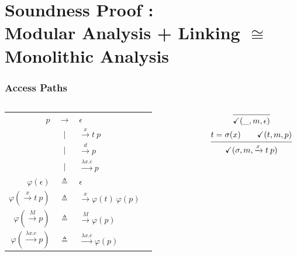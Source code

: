 \documentclass{beamer}
\theoremstyle{definition}
\newcommand*{\modid}{d}
\newcommand*{\ctx}{\sigma}
\newcommand*{\mem}{m}
\newcommand*{\valid}{\checkmark}
\newcommand*{\equivalent}{\cong}
\begin{document}
\section{Soundness Proof :\\Modular Analysis + Linking \texorpdfstring{$\equivalent$}{a} Monolithic Analysis}
\begin{frame}[c]
  \frametitle{Access Paths}
  \scriptsize
  \begin{columns}
    \begin{column}{0.3\linewidth}
      \begin{tabular}{|rcl|r}
        \hline
        $p$                                   & $\rightarrow$ & $\epsilon$                              \\
                                              & $|$           & $\xrightarrow{x}t\:p$                   \\
                                              & $|$           & $\xrightarrow{\modid}p$                 \\
                                              & $|$           & $\xrightarrow{\lambda x.e}p$            \\
        $\varphi(\epsilon)$                   & $\triangleq$  & $\epsilon$                              \\
        $\varphi(\xrightarrow{x}t\:p)$        & $\triangleq$  & $\xrightarrow{x}\varphi(t)\:\varphi(p)$ \\
        $\varphi(\xrightarrow{M}p)$           & $\triangleq$  & $\xrightarrow{M}\varphi(p)$             \\
        $\varphi(\xrightarrow{\lambda x.e}p)$ & $\triangleq$  & $\xrightarrow{\lambda x.e}\varphi(p)$   \\
        \hline
      \end{tabular}
    \end{column}
    \begin{column}{0.05\linewidth}
    \end{column}
    \begin{column}{0.3\linewidth}
      \scriptsize
      \[
        \begin{prooftree}
          \infer0{\valid(\_,\mem,\epsilon)}
        \end{prooftree}
      \]
      \[
        \begin{prooftree}
          \hypo{t=\ctx(x)\qquad\valid(t,\mem,p)}
          \infer1{\valid(\ctx,\mem,\xrightarrow{x}t\:p)}
        \end{prooftree}
      \]

\end{column}
\end{columns}
\end{frame}
\end{document}

